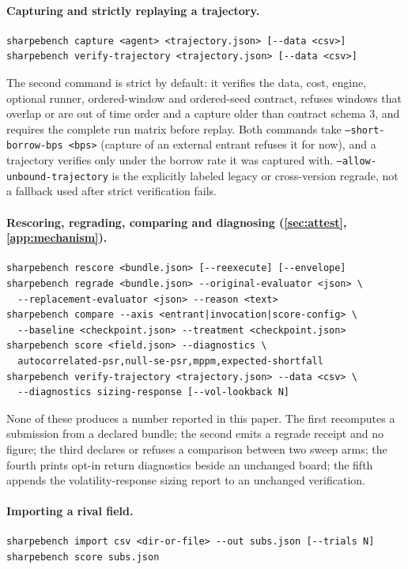 \paragraph{Capturing and strictly replaying a trajectory.}
\begin{verbatim}
sharpebench capture <agent> <trajectory.json> [--data <csv>]
sharpebench verify-trajectory <trajectory.json> [--data <csv>]
\end{verbatim}
The second command is strict by default: it verifies the data, cost, engine, optional runner, ordered-window and ordered-seed contract, refuses windows that overlap or are out of time order and a capture older than contract schema 3, and requires the complete run matrix before replay. Both commands take \texttt{--short-borrow-bps <bps>} (capture of an external entrant refuses it for now), and a trajectory verifies only under the borrow rate it was captured with. \texttt{--allow-unbound-trajectory} is the explicitly labeled legacy or cross-version regrade, not a fallback used after strict verification fails.

\paragraph{Rescoring, regrading, comparing and diagnosing (\cref{sec:attest}, \cref{app:mechanism}).}
\begin{verbatim}
sharpebench rescore <bundle.json> [--reexecute] [--envelope]
sharpebench regrade <bundle.json> --original-evaluator <json> \
  --replacement-evaluator <json> --reason <text>
sharpebench compare --axis <entrant|invocation|score-config> \
  --baseline <checkpoint.json> --treatment <checkpoint.json>
sharpebench score <field.json> --diagnostics \
  autocorrelated-psr,null-se-psr,mppm,expected-shortfall
sharpebench verify-trajectory <trajectory.json> --data <csv> \
  --diagnostics sizing-response [--vol-lookback N]
\end{verbatim}
None of these produces a number reported in this paper. The first recomputes a submission from a declared bundle; the second emits a regrade receipt and no figure; the third declares or refuses a comparison between two sweep arms; the fourth prints opt-in return diagnostics beside an unchanged board; the fifth appends the volatility-response sizing report to an unchanged verification.

\paragraph{Importing a rival field.}
\begin{verbatim}
sharpebench import csv <dir-or-file> --out subs.json [--trials N]
sharpebench score subs.json
\end{verbatim}

